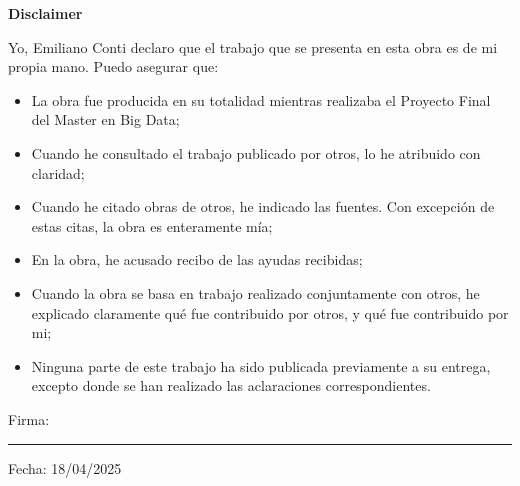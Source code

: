 
\thispagestyle{empty}

\begin{center}
    \Large\bfseries Disclaimer
\end{center}
\vspace{1cm}

\noindent Yo, Emiliano Conti declaro que el trabajo que se presenta en esta obra es de mi propia mano. Puedo asegurar que:

\begin{itemize}
    \item La obra fue producida en su totalidad mientras realizaba el Proyecto Final del Master en Big Data;
    \item Cuando he consultado el trabajo publicado por otros, lo he atribuido con claridad;
    \item Cuando he citado obras de otros, he indicado las fuentes. Con excepci\'on de estas citas, la obra es enteramente m\'ia;
    \item En la obra, he acusado recibo de las ayudas recibidas;
    \item Cuando la obra se basa en trabajo realizado conjuntamente con otros, he explicado claramente qu\'e fue contribuido por otros, y qu\'e fue contribuido por mi;
    \item Ninguna parte de este trabajo ha sido publicada previamente a su entrega, excepto donde se han realizado las aclaraciones correspondientes.
\end{itemize}

\vspace{2cm}

\noindent Firma: \rule{5cm}{0.1pt}

\vspace{1cm}

\noindent Fecha: 18/04/2025